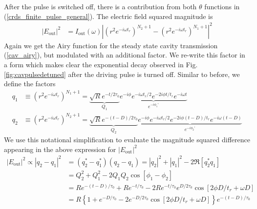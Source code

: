 After the pulse is switched off, there is a contribution from both $\theta$ functions in (\ref{crds_finite_pulse_general}). The electric field squared magnitude is
\begin{align}
	\left|E_\mathrm{out}\right|^2
	&=I_\mathrm{out}(\omega) \left|
	\left(r^2 e^{-i \omega t_r}\right)^{N_2+1} - 
	\left(r^2 e^{-i \omega t_r}\right)^{N_1+1}
	\right|^2
\end{align}
Again we get the Airy function for the steady state cavity transmission (\ref{cav_airy}), but modulated with an additional factor. We re-write this factor in a form which makes clear the exponential decay observed in Fig. \ref{fig:cavpulsedetuned} after the driving pulse is turned off. Similar to before, we define the factors
\begin{align*}
	q_1 &\equiv \left(r^2 e^{-i\omega t_r}\right)^{N_1 +1} = \underbrace{\sqrt{R} e^{-t/2\tau_0}}_{Q_1} \underbrace{e^{-i\phi}e^{-i\omega t_r/2} e^{-2i\phi t/t_r} e^{-i\omega t}}_{e^{-i\phi_1'}} \\
	q_2 &\equiv \left(r^2 e^{-i\omega t_r}\right)^{N_2 +1} = \underbrace{\sqrt{R} e^{-(t-D)/2\tau_0}}_{Q_2} \underbrace{e^{-i\phi}e^{-i\omega t_r/2} e^{-2i\phi (t-D)/t_r} e^{-i\omega (t-D)}}_{e^{-i\phi_2'}}
\end{align*}
We use this notational simplification to evaluate the magnitude squared difference appearing in the above expression for $\left|E_\mathrm{out}\right|^2$
\begin{align*}
	\left|E_\mathrm{out}\right|^2 \propto
	\left|q_2 - q_1\right|^2 &= (q_2^* - q_1^*)(q_2 - q_1) = \left|q_2\right|^2 + \left|q_1\right|^2 - 2 \Re\left[q_2^* q_1\right] \\
	&= Q_2^2 + Q_1^2 - 2 Q_1Q_2 \cos\left[\phi_1 - \phi_2\right] \\
	&= R e^{-(t-D)/\tau_0} + R e^{-t/\tau_0} - 2 R e^{-t/\tau_0}e^{D/2\tau_0}\cos\left[2\phi D/t_r +\omega D\right] \\
	&= R \left\{1 +
	e^{-D/\tau_0} - 2 e^{-D/2\tau_0} \cos\left[2\phi D/t_r +\omega D\right]
	\right\}e^{-(t-D)/\tau_0}
\end{align*}

